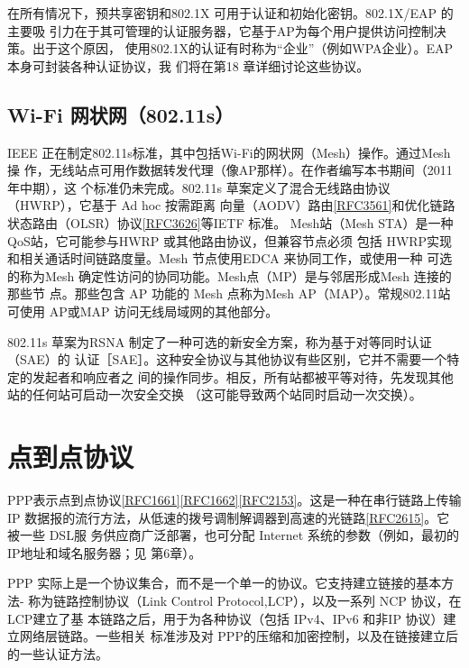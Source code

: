 在所有情况下，预共享密钥和802.1X 可用于认证和初始化密钥。802.1X/EAP 的主要吸
引力在于其可管理的认证服务器，它基于AP为每个用户提供访问控制决策。出于这个原因，
使用802.1X的认证有时称为“企业”（例如WPA企业）。EAP本身可封装各种认证协议，我
们将在第18 章详细讨论这些协议。

\subsection{Wi-Fi 网状网（802.11s）}

IEEE 正在制定802.11s标准，其中包括Wi-Fi的网状网（Mesh）操作。通过Mesh 操
作，无线站点可用作数据转发代理（像AP那样）。在作者编写本书期间（2011年中期），这
个标准仍未完成。802.11s 草案定义了混合无线路由协议（HWRP），它基于 Ad hoc 按需距离
向量（AODV）路由\href{https://www.rfc-editor.org/rfc/rfc3561}{[RFC3561]}和优化链路状态路由（OLSR）协议\href{https://www.rfc-editor.org/rfc/rfc3626}{[RFC3626]}等IETF 标准。
Mesh站（Mesh STA）是一种QoS站，它可能参与HWRP 或其他路由协议，但兼容节点必须
包括 HWRP实现和相关通话时间链路度量。Mesh 节点使用EDCA 来协同工作，或使用一种
可选的称为Mesh 确定性访问的协同功能。Mesh点（MP）是与邻居形成Mesh 连接的那些节
点。那些包含 AP 功能的 Mesh 点称为Mesh AP（MAP）。常规802.11站可使用 AP或MAP
访问无线局域网的其他部分。

802.11s 草案为RSNA 制定了一种可选的新安全方案，称为基于对等同时认证（SAE）的
认证［SAE］。这种安全协议与其他协议有些区别，它并不需要一个特定的发起者和响应者之
间的操作同步。相反，所有站都被平等对待，先发现其他站的任何站可启动一次安全交换
（这可能导致两个站同时启动一次交换）。

\section{点到点协议}

PPP表示点到点协议\href{https://www.rfc-editor.org/rfc/rfc1661}{[RFC1661]}\href{https://www.rfc-editor.org/rfc/rfc1662}{[RFC1662]}\href{https://www.rfc-editor.org/rfc/rfc2153}{[RFC2153]}。这是一种在串行链路上传输IP
数据报的流行方法，从低速的拨号调制解调器到高速的光链路\href{https://www.rfc-editor.org/rfc/rfc2615}{[RFC2615]}。它被一些 DSL服
务供应商广泛部署，也可分配 Internet 系统的参数（例如，最初的IP地址和域名服务器；见
第6章）。

PPP 实际上是一个协议集合，而不是一个单一的协议。它支持建立链接的基本方法-
称为链路控制协议（Link Control Protocol,LCP），以及一系列 NCP 协议，在LCP建立了基
本链路之后，用于为各种协议（包括 IPv4、IPv6 和非IP 协议）建立网络层链路。一些相关
标准涉及对 PPP的压缩和加密控制，以及在链接建立后的一些认证方法。

